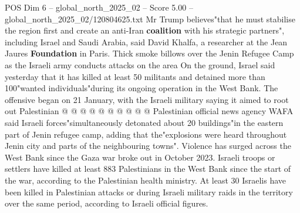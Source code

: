 \begin{textsample}{POS Dim 6 – global\_north\_2025\_02 – Score 5.00 – global\_north\_2025\_02/120804625.txt}
Mr Trump believes"that he must stabilise the region first and create an anti-Iran \textbf{coalition} with his strategic partners", including Israel and Saudi Arabia, said David Khalfa, a researcher at the Jean Jaures \textbf{Foundation} in Paris.
Thick smoke billows over the Jenin Refugee Camp as the Israeli army conducts attacks on the area On the ground, Israel said yesterday that it has killed at least 50 militants and detained more than 100"wanted individuals"during its ongoing operation in the West Bank.
The offensive began on 21 January, with the Israeli military saying it aimed to root out Palestinian @ @ @ @ @ @ @ @ @ @ Palestinian official news agency WAFA said Israeli forces"simultaneously detonated about 20 buildings"in the eastern part of Jenin refugee camp, adding that the"explosions were heard throughout Jenin city and parts of the neighbouring towns".
Violence has surged across the West Bank since the Gaza war broke out in October 2023.
Israeli troops or settlers have killed at least 883 Palestinians in the West Bank since the start of the war, according to the Palestinian health ministry.
At least 30 Israelis have been killed in Palestinian attacks or during Israeli military raids in the territory over the same period, according to Israeli official figures.

\end{textsample}
